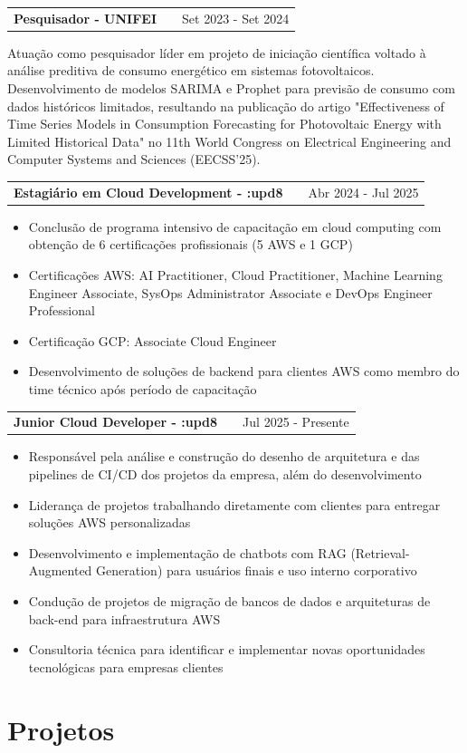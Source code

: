 \documentclass[a4paper,12pt]{article}
\makeatletter
\newenvironment{jobshort}[2]
    {
    \begin{tabularx}{\linewidth}{@{}l X r@{}}
    \textbf{#1} & \hfill &  #2 \\[3.75pt]
    \end{tabularx}
    }
    {
    }
\newenvironment{joblong}[2]
    {
    \begin{tabularx}{\linewidth}{@{}l X r@{}}
    \textbf{#1} & \hfill &  #2 \\[3.75pt]
    \end{tabularx}
    \begin{minipage}[t]{\linewidth}
    \begin{itemize}[nosep,after=\strut, leftmargin=1em, itemsep=3pt,label=--]
    }
    {
    \end{itemize}
    \end{minipage}    
    }
\makeatother
\begin{document}
\begin{jobshort}{Pesquisador - UNIFEI}{Set 2023 - Set 2024}
Atuação como pesquisador líder em projeto de iniciação científica voltado à análise preditiva de consumo energético em sistemas fotovoltaicos. Desenvolvimento de modelos SARIMA e Prophet para previsão de consumo com dados históricos limitados, resultando na publicação do artigo "Effectiveness of Time Series Models in Consumption Forecasting for Photovoltaic Energy with Limited Historical Data" no 11th World Congress on Electrical Engineering and Computer Systems and Sciences (EECSS'25).
\end{jobshort}

\begin{joblong}{Estagiário em Cloud Development - :upd8}{Abr 2024 - Jul 2025}
\item Conclusão de programa intensivo de capacitação em cloud computing com obtenção de 6 certificações profissionais (5 AWS e 1 GCP)
\item Certificações AWS: AI Practitioner, Cloud Practitioner, Machine Learning Engineer Associate, SysOps Administrator Associate e DevOps Engineer Professional
\item Certificação GCP: Associate Cloud Engineer
\item Desenvolvimento de soluções de backend para clientes AWS como membro do time técnico após período de capacitação
\end{joblong}

\begin{joblong}{Junior Cloud Developer - :upd8}{Jul 2025 - Presente}
\item Responsável pela análise e construção do desenho de arquitetura e das pipelines de CI/CD dos projetos da empresa, além do desenvolvimento
\item Liderança de projetos trabalhando diretamente com clientes para entregar soluções AWS personalizadas
\item Desenvolvimento e implementação de chatbots com RAG (Retrieval-Augmented Generation) para usuários finais e uso interno corporativo
\item Condução de projetos de migração de bancos de dados e arquiteturas de back-end para infraestrutura AWS
\item Consultoria técnica para identificar e implementar novas oportunidades tecnológicas para empresas clientes
\end{joblong}
  
\section{Projetos}
\end{document}
